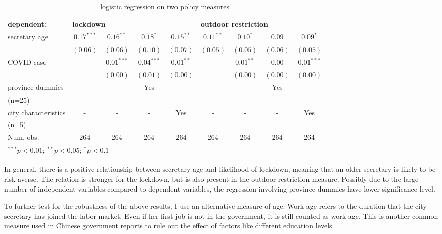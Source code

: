 \documentclass{article}
\begin{document}
\begin{CJK}{UTF8}{gbsn}
\begin{table}[H]
\caption{logistic regression on two policy measures}
\begin{center}
\begin{tabular}{l c c c c c c c c}
\hline
dependent: & \multicolumn{4}{l}{lockdown}  & \multicolumn{4}{l}{outdoor restriction}\\
\hline
secretary age  & $0.17^{***}$ & $0.16^{**}$  & $0.18^{*}$   & $0.15^{**}$ & $0.11^{**}$ & $0.10^{*}$  & $0.09$    & $0.09^{*}$   \\
               & $(0.06)$     & $(0.06)$     & $(0.10)$     & $(0.07)$    & $(0.05)$    & $(0.05)$    & $(0.06)$  & $(0.05)$     \\
COVID case     &              & $0.01^{***}$ & $0.04^{***}$ & $0.01^{**}$ &             & $0.01^{**}$ & $0.00$    & $0.01^{***}$ \\
               &              & $(0.00)$     & $(0.01)$     & $(0.00)$    &             & $(0.00)$    & $(0.00)$  & $(0.00)$     \\
province dummies &-&-&Yes&-&-&-&Yes&- \\
(n=25)\\
city characteristics &-&-&-&Yes&-&-&-&Yes \\
(n=5)\\

\hline
Num. obs.      & $264$        & $264$        & $264$        & $264$        & $264$        & $264$        & $264$       & $264$        \\
\hline
\multicolumn{9}{l}{\scriptsize{$^{***}p<0.01$; $^{**}p<0.05$; $^{*}p<0.1$}}
\end{tabular}
\label{Table 1}
\end{center}
\end{table}


In general, there is a positive relationship between secretary age and likelihood of lockdown, meaning that an older secretary is likely to be risk-averse. The relation is stronger for the lockdown, but is also present in the outdoor restriction measure.  Possibly due to the large number of independent variables compared to dependent variables, the regression involving province dummies have lower significance level.

To further test for the robustness of the above results, I use an alternative measure of age. Work age refers to the duration that the city secretary has joined the labor market. Even if her first job is not in the government, it is still counted as work age. This is another common measure used in Chinese government reports to rule out the effect of factors like different education levels. 


\end{CJK}
\end{document}
